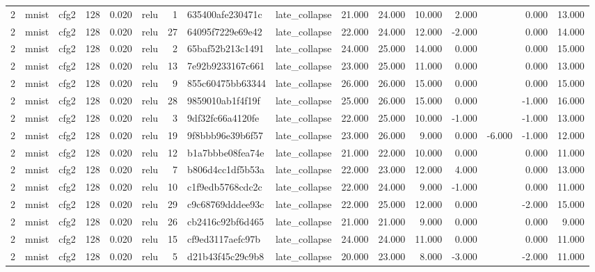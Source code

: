 \begin{table}[htbp]
{\begin{tabular}{@{}rllrrlrllrrrrrrr@{}}
2 & mnist & cfg2 & 128 & 0.020 & relu & 1 & 635400afe230471c & late\_collapse & 21.000 & 24.000 & 10.000 & 2.000 &  & 0.000 & 13.000 \\
2 & mnist & cfg2 & 128 & 0.020 & relu & 27 & 64095f7229e69e42 & late\_collapse & 22.000 & 24.000 & 12.000 & -2.000 &  & 0.000 & 14.000 \\
2 & mnist & cfg2 & 128 & 0.020 & relu & 2 & 65baf52b213c1491 & late\_collapse & 24.000 & 25.000 & 14.000 & 0.000 &  & 0.000 & 15.000 \\
2 & mnist & cfg2 & 128 & 0.020 & relu & 13 & 7e92b9233167c661 & late\_collapse & 23.000 & 25.000 & 11.000 & 0.000 &  & 0.000 & 13.000 \\
2 & mnist & cfg2 & 128 & 0.020 & relu & 9 & 855c60475bb63344 & late\_collapse & 26.000 & 26.000 & 15.000 & 0.000 &  & 0.000 & 15.000 \\
2 & mnist & cfg2 & 128 & 0.020 & relu & 28 & 9859010ab1f4f19f & late\_collapse & 25.000 & 26.000 & 15.000 & 0.000 &  & -1.000 & 16.000 \\
2 & mnist & cfg2 & 128 & 0.020 & relu & 3 & 9df32fc66a4120fe & late\_collapse & 22.000 & 25.000 & 10.000 & -1.000 &  & -1.000 & 13.000 \\
2 & mnist & cfg2 & 128 & 0.020 & relu & 19 & 9f8bbb96e39b6f57 & late\_collapse & 23.000 & 26.000 & 9.000 & 0.000 & -6.000 & -1.000 & 12.000 \\
2 & mnist & cfg2 & 128 & 0.020 & relu & 12 & b1a7bbbe08fea74e & late\_collapse & 21.000 & 22.000 & 10.000 & 0.000 &  & 0.000 & 11.000 \\
2 & mnist & cfg2 & 128 & 0.020 & relu & 7 & b806d4cc1df5b53a & late\_collapse & 22.000 & 23.000 & 12.000 & 4.000 &  & 0.000 & 13.000 \\
2 & mnist & cfg2 & 128 & 0.020 & relu & 10 & c1f9edb5768cdc2c & late\_collapse & 22.000 & 24.000 & 9.000 & -1.000 &  & 0.000 & 11.000 \\
2 & mnist & cfg2 & 128 & 0.020 & relu & 29 & c9c68769dddee93c & late\_collapse & 22.000 & 25.000 & 12.000 & 0.000 &  & -2.000 & 15.000 \\
2 & mnist & cfg2 & 128 & 0.020 & relu & 26 & cb2416c92bf6d465 & late\_collapse & 21.000 & 21.000 & 9.000 & 0.000 &  & 0.000 & 9.000 \\
2 & mnist & cfg2 & 128 & 0.020 & relu & 15 & cf9ed3117aefc97b & late\_collapse & 24.000 & 24.000 & 11.000 & 0.000 &  & 0.000 & 11.000 \\
2 & mnist & cfg2 & 128 & 0.020 & relu & 5 & d21b43f45c29c9b8 & late\_collapse & 20.000 & 23.000 & 8.000 & -3.000 &  & -2.000 & 11.000 \\

\end{tabular}}
\end{table}
